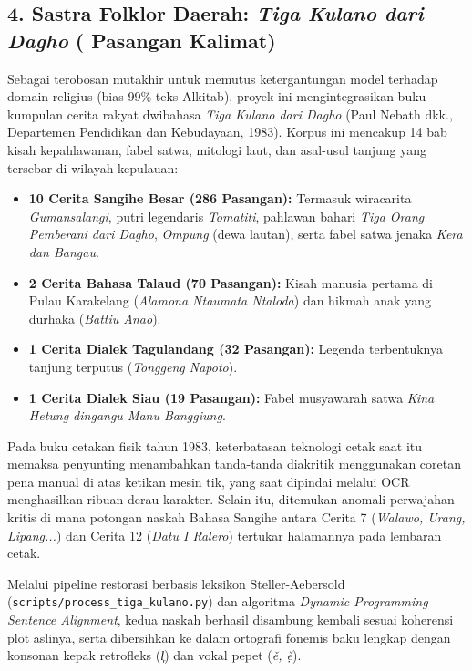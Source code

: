 \subsection{4. Sastra Folklor Daerah: \textit{Tiga Kulano dari Dagho} (\StatCorpusTigaKulano{} Pasangan Kalimat)}
Sebagai terobosan mutakhir untuk memutus ketergantungan model terhadap domain religius (bias 99\% teks Alkitab), proyek ini mengintegrasikan buku kumpulan cerita rakyat dwibahasa \textit{Tiga Kulano dari Dagho} (Paul Nebath dkk., Departemen Pendidikan dan Kebudayaan, 1983). Korpus ini mencakup 14 bab kisah kepahlawanan, fabel satwa, mitologi laut, dan asal-usul tanjung yang tersebar di wilayah kepulauan:
\begin{itemize}
    \item \textbf{10 Cerita Sangihe Besar (286 Pasangan):} Termasuk wiracarita \textit{Gumansalangi}, putri legendaris \textit{Tomatiti}, pahlawan bahari \textit{Tiga Orang Pemberani dari Dagho}, \textit{Ompung} (dewa lautan), serta fabel satwa jenaka \textit{Kera dan Bangau}.
    \item \textbf{2 Cerita Bahasa Talaud (70 Pasangan):} Kisah manusia pertama di Pulau Karakelang (\textit{Alamona Ntaumata Ntaloda}) dan hikmah anak yang durhaka (\textit{Battiu Anao}).
    \item \textbf{1 Cerita Dialek Tagulandang (32 Pasangan):} Legenda terbentuknya tanjung terputus (\textit{Tonggeng Napoto}).
    \item \textbf{1 Cerita Dialek Siau (19 Pasangan):} Fabel musyawarah satwa \textit{Kina Hetung dingangu Manu Banggiung}.
\end{itemize}

\begin{infobox}
Pada buku cetakan fisik tahun 1983, keterbatasan teknologi cetak saat itu memaksa penyunting menambahkan tanda-tanda diakritik menggunakan coretan pena manual di atas ketikan mesin tik, yang saat dipindai melalui OCR menghasilkan ribuan derau karakter. Selain itu, ditemukan anomali perwajahan kritis di mana potongan naskah Bahasa Sangihe antara Cerita 7 (\textit{Walawo, Urang, Lipang...}) dan Cerita 12 (\textit{Datu I Ralero}) tertukar halamannya pada lembaran cetak. 

Melalui pipeline restorasi berbasis leksikon Steller-Aebersold (\texttt{scripts/process\_tiga\_kulano.py}) dan algoritma \textit{Dynamic Programming Sentence Alignment}, kedua naskah berhasil disambung kembali sesuai koherensi plot aslinya, serta dibersihkan ke dalam ortografi fonemis baku lengkap dengan konsonan kepak retrofleks (\textit{l᷊}) dan vokal pepet (\textit{ě, ẹ̌}).
\end{infobox}

